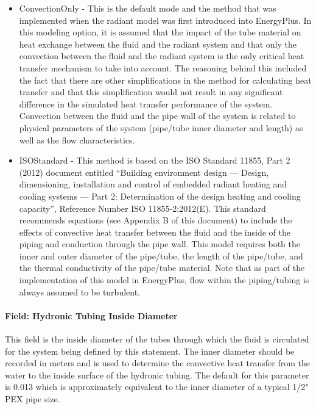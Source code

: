 \begin{itemize}
\item
  ConvectionOnly - This is the default mode and the method that was implemented when the radiant model was first introduced into EnergyPlus.  In this modeling option, it is assumed that the impact of the tube material on heat exchange between the fluid and the radiant system and that only the convection between the fluid and the radiant system is the only critical heat transfer mechanism to take into account.  The reasoning behind this included the fact that there are other simplifications in the method for calculating heat transfer and that this simplification would not result in any significant difference in the simulated heat transfer performance of the system.  Convection between the fluid and the pipe wall of the system is related to physical parameters of the system (pipe/tube inner diameter and length) as well as the flow characteristics.
\item
  ISOStandard - This method is based on the ISO Standard 11855, Part 2 (2012) document entitled ``Building environment design — Design, dimensioning, installation and control of embedded radiant heating and cooling systems — Part 2: Determination of the design heating and cooling capacity'', Reference Number ISO 11855-2:2012(E).  This standard recommends equations (see Appendix B of this document) to include the effects of convective heat transfer between the fluid and the inside of the piping and conduction through the pipe wall.  This model requires both the inner and outer diameter of the pipe/tube, the length of the pipe/tube, and the thermal conductivity of the pipe/tube material.  Note that as part of the implementation of this model in EnergyPlus, flow within the piping/tubing is always assumed to be turbulent.
\end{itemize}

\paragraph{Field: Hydronic Tubing Inside Diameter}\label{field-hydronic-tubing-inside-diameter-000}

This field is the inside diameter of the tubes through which the fluid is circulated for the system being defined by this statement. The inner diameter should be recorded in meters and is used to determine the convective heat transfer from the water to the inside surface of the hydronic tubing.  The default for this parameter is 0.013 which is approximately equivalent to the inner diameter of a typical 1/2" PEX pipe size.

